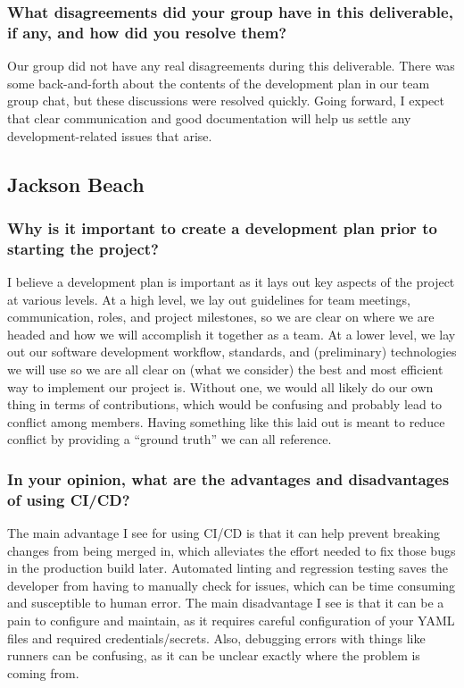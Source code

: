 \documentclass{article}
\begin{document}
\subsubsection*{What disagreements did your group have in this deliverable, if any, and how did you resolve them?}
Our group did not have any real disagreements during this deliverable. There was some back-and-forth
about the contents of the development plan in our team group chat, but these discussions
were resolved quickly. Going forward, I expect that clear communication and good documentation
will help us settle any development-related issues that arise.

\subsection*{Jackson Beach}

\subsubsection*{Why is it important to create a development plan prior to starting the project?}
I believe a development plan is important as it lays out key aspects of the project at various levels.
At a high level, we lay out guidelines for team meetings, communication, roles, and project milestones, so we are clear on
where we are headed and how we will accomplish it together as a team. At a lower level, we lay out our software development workflow,
standards, and (preliminary) technologies we will use so we are all clear on (what we consider) the best and most efficient
way to implement our project is. Without one, we would all likely do our own thing in terms of contributions, which would be confusing
and probably lead to conflict among members. Having something like this laid out is meant to reduce conflict by providing a
``ground truth'' we can all reference.

\subsubsection*{In your opinion, what are the advantages and disadvantages of using CI/CD?}
The main advantage I see for using CI/CD is that it can help prevent breaking changes from
being merged in, which alleviates the effort needed to fix those bugs in the production build later. Automated linting
and regression testing saves the developer from having to manually check for issues, which can be time consuming and susceptible to human error.
The main disadvantage I see is that it can be a pain to configure and maintain, as it requires careful configuration of your
YAML files and required credentials/secrets. Also, debugging errors with things like runners can be confusing, as it can be
unclear exactly where the problem is coming from.
\end{document}
